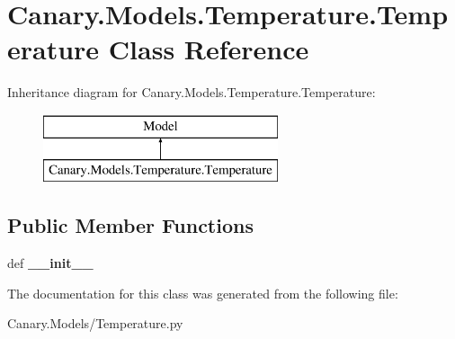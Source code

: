 \hypertarget{class_canary_8_models_1_1_temperature_1_1_temperature}{\section{Canary.\-Models.\-Temperature.\-Temperature Class Reference}
\label{class_canary_8_models_1_1_temperature_1_1_temperature}
}
Inheritance diagram for Canary.\-Models.\-Temperature.\-Temperature\-:\begin{figure}[H]
\begin{center}
\leavevmode
\includegraphics[height=2.000000cm]{class_canary_8_models_1_1_temperature_1_1_temperature}
\end{center}
\end{figure}
\subsection*{Public Member Functions}
\begin{DoxyCompactItemize}
\item 
\hypertarget{class_canary_8_models_1_1_temperature_1_1_temperature_a11109473dc7e4cee410383dcaa36b191}{def {\bfseries \-\_\-\-\_\-init\-\_\-\-\_\-}}\label{class_canary_8_models_1_1_temperature_1_1_temperature_a11109473dc7e4cee410383dcaa36b191}

\end{DoxyCompactItemize}


The documentation for this class was generated from the following file\-:\begin{DoxyCompactItemize}
\item 
Canary.\-Models/Temperature.\-py\end{DoxyCompactItemize}

